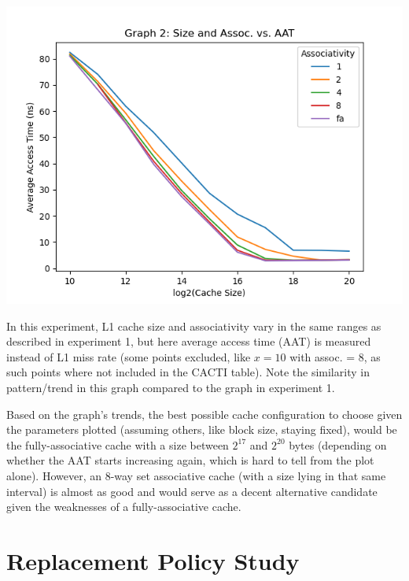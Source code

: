 \documentclass{article}
\begin{document}
    \includegraphics[width=\textwidth]{../graph_logs/graph2.png}

    In this experiment, L1 cache size and associativity vary in the same ranges as described in experiment 1, but here 
    average access time (AAT) is measured instead of L1 miss rate (some points excluded, like $x = 10$ with assoc. = 
    8, as such points where not included in the CACTI table). Note the similarity in pattern/trend in this graph 
    compared to the graph in experiment 1.

    Based on the graph's trends, the best possible cache configuration to choose given the parameters plotted (assuming 
    others, like block size, staying fixed), would be the fully-associative cache with a size between $2^{17}$ and 
    $2^{20}$ bytes (depending on whether the AAT starts increasing again, which is hard to tell from the plot alone). 
    However, an 8-way set associative cache (with a size lying in that same interval) is almost as good and would serve as a decent alternative candidate given 
    the weaknesses of a fully-associative cache.

    \newpage

    \section{Replacement Policy Study}
\end{document}
